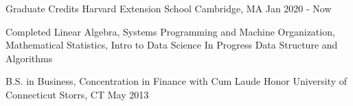 

\begin{cventries}

  \cventry
    {Graduate Credits} %
    {Harvard Extension School} %
    {Cambridge, MA} %
    {Jan 2020 -  Now} %
    {
      \begin{cvskills}
        \cvskill
          {Completed} %
          {Linear Algebra, Systems Programming and Machine Organization, Mathematical Statistics, Intro to Data Science} %
        \cvskill
          {In Progress} %
          {Data Structure and Algorithms}
      \end{cvskills}
    }
  \cventry
    {B.S. in Business, Concentration in Finance with Cum Laude Honor} %
    {University of Connecticut} %
    {Storrs, CT} %
    {May 2013} %
    {
    }
\end{cventries}
